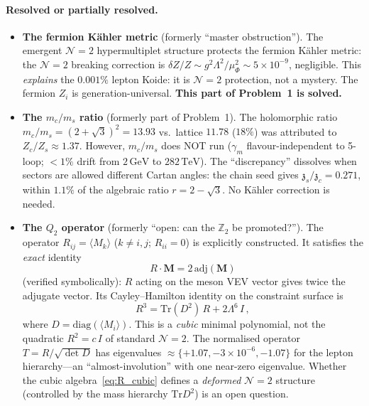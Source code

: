 \documentclass[aps,prd,twocolumn,showpacs,preprintnumbers,superscriptaddress,floatfix]{revtex4-2}
\newcommand{\Tr}{\mathrm{Tr}}
\newcommand{\adj}{\mathrm{adj}}
\newcommand{\diag}{\mathrm{diag}}
\newcommand{\GeV}{\,\mathrm{GeV}}
\newcommand{\TeV}{\,\mathrm{TeV}}
\newcommand{\zch}{\mathfrak{z}}
\begin{document}
\paragraph{Resolved or partially resolved.}
\begin{itemize}
\item \textbf{The fermion K\"ahler metric} (formerly ``master
  obstruction'').
  The emergent $\mathcal{N}{=}2$ hypermultiplet structure
  protects the fermion K\"ahler metric: the $\mathcal{N}{=}2$
  breaking correction is $\delta Z/Z \sim g^2\Lambda^2/\mu_\Phi^2
  \sim 5 \times 10^{-9}$, negligible.
  This \emph{explains} the $0.001\%$ lepton Koide: it is
  $\mathcal{N}{=}2$ protection, not a mystery.
  The fermion $Z_i$ is generation-universal.
  \textbf{This part of Problem~1 is solved.}

\item \textbf{The $m_c/m_s$ ratio} (formerly part of Problem~1).
  The holomorphic ratio $m_c/m_s = (2+\sqrt{3})^2 = 13.93$
  vs.\ lattice $11.78$ ($18\%$) was attributed to
  $Z_c/Z_s \approx 1.37$.
  However, $m_c/m_s$ does NOT run ($\gamma_m$
  flavour-independent to 5-loop; $< 1\%$ drift from
  $2\GeV$ to $282\TeV$).
  The ``discrepancy'' dissolves when sectors are allowed
  different Cartan angles: the chain seed gives
  $\zch_s/\zch_c = 0.271$, within $1.1\%$ of the algebraic
  ratio $r = 2 - \sqrt{3}$.
  No K\"ahler correction is needed.

\item \textbf{The $Q_2$ operator} (formerly ``open: can the
  $\mathbb{Z}_2$ be promoted?'').
  The operator $R_{ij} = \langle M_k\rangle$
  ($k \neq i,j$; $R_{ii} = 0$) is explicitly constructed.
  It satisfies the \emph{exact} identity
  \begin{equation}
    R \cdot \mathbf{M} = 2\,\adj(\mathbf{M})
    \label{eq:RM_adjM}
  \end{equation}
  (verified symbolically): $R$ acting on the meson VEV vector
  gives twice the adjugate vector.
  Its Cayley--Hamilton identity on the constraint surface is
  \begin{equation}
    R^3 = \Tr(D^2)\,R + 2\Lambda^6\,I\,,
    \label{eq:R_cubic}
  \end{equation}
  where $D = \diag(\langle M_i\rangle)$.
  This is a \emph{cubic} minimal polynomial, not the quadratic
  $R^2 = c\,I$ of standard $\mathcal{N}{=}2$.
  The normalised operator $T = R/\sqrt{\det D}$ has eigenvalues
  $\approx \{+1.07, -3 \times 10^{-6}, -1.07\}$ for the
  lepton hierarchy---an ``almost-involution'' with one
  near-zero eigenvalue.
  Whether the cubic algebra~\eqref{eq:R_cubic} defines a
  \emph{deformed} $\mathcal{N}{=}2$ structure (controlled by
  the mass hierarchy $\Tr D^2$) is an open question.
\end{itemize}
\end{document}
